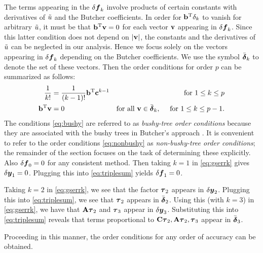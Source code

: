 The terms appearing in the $\delta\boldsymbol{f}_k$ involve products of certain constants
with derivatives of $\tilde{u}$ and the Butcher coefficients.  In order for $\mathbf{b}^\mathrm{T} \delta_k$
to vanish for arbitrary $\tilde{u}$, it must be that $\mathbf{b}^\mathrm{T} \mathbf{v} = 0$ for each vector $\mathbf{v}$
appearing in $\delta\boldsymbol{f}_k$.  Since this latter condition does not depend on $|\mathbf{v}|$,
the constants and the derivatives of $\tilde{u}$ can be neglected in our analysis.
Hence we focus solely on the vectors appearing in $\delta\boldsymbol{f}_k$ depending on the 
Butcher coefficients.  We use the symbol $\bar{\boldsymbol{\delta}}_k$ to denote the set of these vectors.
Then the order conditions for order $p$ can be summarized as follows:
\begin{subequations}
\begin{align}\label{eq:bushy}
\frac{1}{k!} & = \frac{1}{(k-1)!}\bb\transpose \bc^{k-1} 
            & \mbox{for } 1\le k\le p \\
\bb\transpose\bv & = 0 & \mbox{for all } \bv\in\deltaset_k, \ \ \ \ \mbox{for } 1\le k\le p-1.
\label{eq:nonbushy}
\end{align}
\end{subequations}
The conditions \eqref{eq:bushy} are referred to as {\em bushy-tree order conditions}
because they are associated with the bushy trees in Butcher's approach \cite{butcher2003}.
It is convenient to refer to the order conditions \eqref{eq:nonbushy} as {\em non-bushy-tree
order conditions}; the remainder of the section focuses on the task of determining these
explicitly.
Also $\delta\boldsymbol{f}_0=0$ for any consistent method. Then taking $k=1$
in \eqref{eq:gserrk} gives $\delta\boldsymbol{y}_1=0$.  Plugging this into \eqref{eq:triplesum}
yields $\delta\boldsymbol{f}_1=0$.

Taking $k=2$ in \eqref{eq:gserrk}, we see that the factor $\boldsymbol{\tau}_2$ appears in $\delta\boldsymbol{y}_2$.
Plugging this into \eqref{eq:triplesum}, we see that $\boldsymbol{\tau}_2$ appears in $\bar{\boldsymbol{\delta}}_2$.
Using this (with $k=3$) in \eqref{eq:gserrk}, we have that $\mathbf{A}\boldsymbol{\tau}_2$ and $\boldsymbol{\tau}_3$
appear in $\delta\boldsymbol{y}_3$.  Substituting this into \eqref{eq:triplesum} reveals that terms
proportional to $\mathbf{C}\boldsymbol{\tau}_2, \mathbf{A}\boldsymbol{\tau}_2, \boldsymbol{\tau}_3$ appear in $\bar{\boldsymbol{\delta}}_3$.

Proceeding in this manner, the order conditions for any order of accuracy can be obtained.



